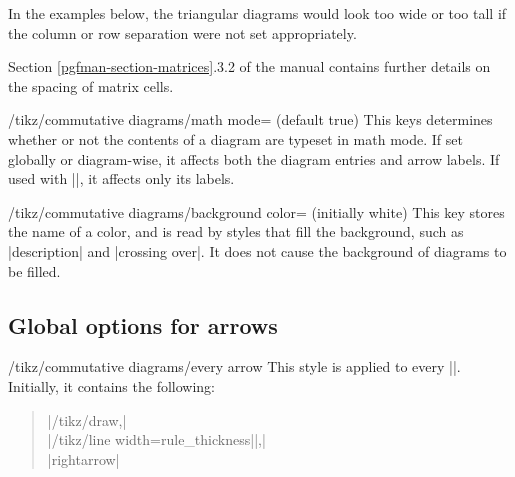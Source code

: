 \documentclass[a4paper]{ltxdoc}
\begin{document}
In the examples below, the triangular diagrams would look too wide or
too tall if the column or row separation were not set appropriately.

\begin{codeexample}[]
\end{codeexample}

\begin{codeexample}[]
\end{codeexample}

Section \ref*{pgfman-section-matrices}.3.2 of the \pgfname{} manual
\cite{pgfman} contains further details on the spacing of matrix cells.

\begin{key}{/tikz/commutative diagrams/math mode=
     (default true)}
  This keys determines whether or not the contents of a diagram are
  typeset in math mode.  If set globally or diagram-wise, it affects
  both the diagram entries and arrow labels.  If used with |\arrow|,
  it affects only its labels.
\end{key}

\begin{key}{/tikz/commutative diagrams/background color= (initially white)}
  This key stores the name of a color, and is read by 
  styles that fill the background, such as |description| and |crossing over|.
  It does not cause the background of diagrams to be filled.
\end{key}

\subsection{Global options for arrows}
\label{sec:options-arrows}

\begin{stylekey}{/tikz/commutative diagrams/every arrow}
  This style is applied to every |\arrow|.  Initially, it contains the
  following:
\begin{quote}
|/tikz/draw,|\\
|/tikz/line width=rule_thickness||,|\\
|rightarrow|
\end{quote}
\end{stylekey}
\end{document}
